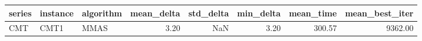 \begin{tabular}{lllrrrrr}
\toprule
series & instance & algorithm & mean_delta & std_delta & min_delta & mean_time & mean_best_iter \\
\midrule
CMT & CMT1 & MMAS & 3.20 & NaN & 3.20 & 300.57 & 9362.00 \\
\bottomrule
\end{tabular}
